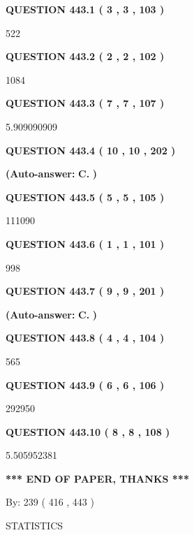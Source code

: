 \documentclass{ctexart}
\begin{document}
   
   
   
  
  
{\textbf{\large{QUESTION
443.1 
 ( 3 , 3 , 103 )
}}}

522
  
  
{\textbf{\large{QUESTION
443.2 
 ( 2 , 2 , 102 )
}}}

1084
  
  
{\textbf{\large{QUESTION
443.3 
 ( 7 , 7 , 107 )
}}}

5.909090909
  
  
{\textbf{\large{QUESTION
443.4 
 ( 10 , 10 , 202 )
}}}
 
 
{\textbf{(Auto-answer:}}
{\textbf{\large{
C.}}}
{\textbf{)}}
 
 
  
  
{\textbf{\large{QUESTION
443.5 
 ( 5 , 5 , 105 )
}}}

111090
  
  
{\textbf{\large{QUESTION
443.6 
 ( 1 , 1 , 101 )
}}}

998
  
  
{\textbf{\large{QUESTION
443.7 
 ( 9 , 9 , 201 )
}}}
 
 
{\textbf{(Auto-answer:}}
{\textbf{\large{
C.}}}
{\textbf{)}}
 
 
  
  
{\textbf{\large{QUESTION
443.8 
 ( 4 , 4 , 104 )
}}}

565
  
  
{\textbf{\large{QUESTION
443.9 
 ( 6 , 6 , 106 )
}}}

292950
  
  
{\textbf{\large{QUESTION
443.10 
 ( 8 , 8 , 108 )
}}}

5.505952381
   
   
   
   
\vspace{1.0in} 
{\textbf{\large{ *** END OF PAPER, THANKS *** }}} 
   
   
\hspace{1.0in} By: 
 239 ( 416 ,  443 )
   
   
   
\vspace{0.2in}
\vspace{0.2in}
   
   
 \newpage
\setcounter{page}{1} 
   
   
 {\LARGE{STATISTICS}}
   
\vspace{0.2in}
   
\end{document}
